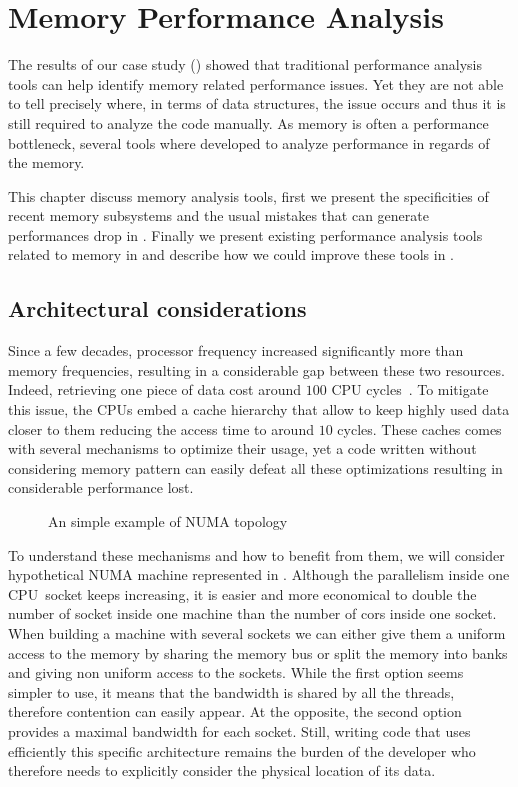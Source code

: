 \chapter{Memory Performance Analysis}

The results of our case study () showed that traditional performance analysis tools can help identify memory related performance issues.
Yet they are not able to tell precisely where, in terms of data structures, the issue occurs and thus it is still required to analyze the code manually.
As memory is often a performance bottleneck, several tools where developed to analyze performance in regards of the memory.

This chapter discuss memory analysis tools, first we present the specificities of recent memory subsystems and the usual mistakes that can generate performances drop in .
Finally we present existing performance analysis tools related to memory in  and describe how we could improve these tools in .

\section{Architectural considerations}
\label{sec:archi}

Since a few decades, processor frequency increased significantly more than memory frequencies, resulting in a considerable gap between these two resources.
Indeed, retrieving one piece of data cost around $100$ \gls{CPU} cycles~\cite{Drepper07What}.
To mitigate this issue, the \glspl{CPU} embed a cache hierarchy that allow to keep highly used data closer to them reducing the access time to around $10$ cycles.
These caches comes with several mechanisms to optimize their usage, yet a code written without considering memory pattern can easily defeat all these optimizations resulting in considerable performance lost.

\begin{figure}[htb]
    \centering
    
    \caption{An simple example of NUMA topology}
    \label{fig:topo-NUMA}
\end{figure}

To understand these mechanisms and how to benefit from them, we will consider hypothetical \gls{NUMA} machine represented in .
Although the parallelism inside one \gls{CPU} socket keeps increasing, it is easier and more economical to double the number of socket inside one machine than the number of cors inside one socket.
When building a machine with several sockets we can either give them a uniform access to the memory by sharing the memory bus or split the memory into banks and giving non uniform access to the sockets.
While the first option seems simpler to use, it means that the bandwidth is shared by all the threads, therefore contention can easily appear.
At the opposite, the second option provides a maximal bandwidth for each socket.
Still, writing code that uses efficiently this specific architecture remains the burden of the developer who therefore needs to explicitly consider the physical location of its data.

